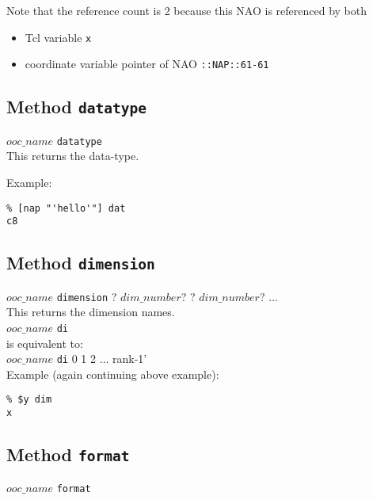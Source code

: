Note that the reference count is 2 because this NAO is referenced
by both
  \begin{itemize}
    \item Tcl variable 
    \texttt{x}
    \item coordinate variable pointer of NAO 
    \texttt{::NAP::61-61}
  \end{itemize}
  \subsection{
    \label{datatype}Method \texttt{datatype}
  }

  


  $ooc\_name$ 
  \texttt{datatype}
  \\
  

This returns the data-type.
  

Example:
  \begin{verbatim}
% [nap "'hello'"] dat
c8
\end{verbatim}

  \subsection{
    \label{dimension}Method \texttt{dimension}
  }

  


  $ooc\_name$ 
  \texttt{dimension} ?
  $dim\_number$? ?
  $dim\_number$? $\ldots$
  \\
  

This returns the dimension names.
  \\
  


  $ooc\_name$ 
  \texttt{di}
  \\is equivalent to:
  \\
  $ooc\_name$ 
  \texttt{di} 0 1 2 $\ldots$ rank-1'
  \\
  

Example (again continuing above example):
  \begin{verbatim}
% $y dim
x
\end{verbatim}

  \subsection{
    \label{format}Method \texttt{format}
  }

  


  $ooc\_name$ 
  \texttt{format}
  \\
  

